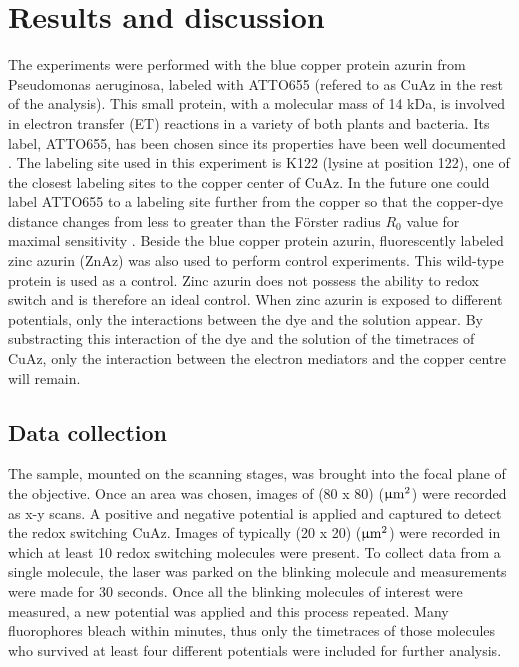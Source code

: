 \documentclass[twoside,single]{lion-msc}
\begin{document}
\chapter{Results and discussion}

The experiments were performed with the blue copper protein azurin from Pseudomonas aeruginosa, labeled with ATTO655 (refered to as CuAz in the rest of the analysis). This small protein, with a molecular mass of 14 kDa, is involved in electron transfer (ET) reactions in a variety of both plants and bacteria. Its label, ATTO655, has been chosen since its properties have been well documented \cite{pvd_11}. The labeling site used in this experiment is K122 (lysine at position 122), one of the closest labeling sites to the copper center of CuAz. In the future one could label ATTO655 to a labeling site further from the copper so that the copper-dye distance changes from less to greater than the F\"{o}rster radius $R_{0}$ value for maximal sensitivity \cite{Roy2008}. 
Beside the blue copper protein azurin, fluorescently labeled zinc azurin (ZnAz) was also used to perform control experiments. This wild-type protein is used as a control. Zinc azurin does not possess the ability to redox switch and is therefore an ideal control. When zinc azurin is exposed to different potentials, only the interactions between the dye and the solution appear. By substracting this interaction of the dye and the solution of the timetraces of CuAz, only the interaction between the electron mediators and the copper centre will remain. 

\section*{Data collection} \label{data_coll}
The sample, mounted on the scanning stages, was brought into the focal plane of the objective. Once an area was chosen, images of (80 x 80) ($\upmu \textup{m}^{2}$) were recorded as x-y scans. A positive and negative potential is applied and captured to detect the redox switching CuAz. Images of typically (20 x 20) ($\upmu \textup{m}^{2}$) were recorded in which at least 10 redox switching molecules were present. To collect data from a single molecule, the laser was parked on the blinking molecule and measurements were made for 30 seconds. Once all the blinking molecules of interest were measured, a new potential was applied and this process repeated. Many fluorophores bleach within minutes, thus only the timetraces of those molecules who survived at least four different potentials were included for further analysis. 
\end{document}
